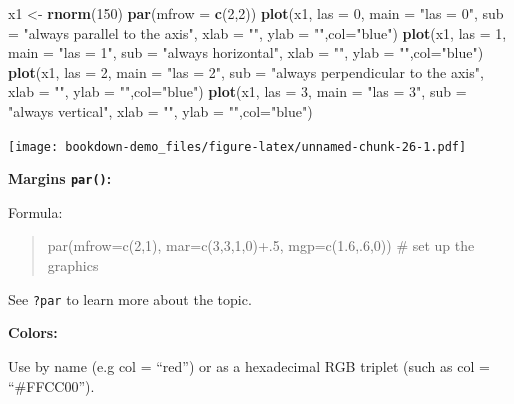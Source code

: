 \documentclass[]{book}
\newenvironment{Shaded}{\begin{snugshade}}{\end{snugshade}}
\newcommand{\KeywordTok}[1]{\textcolor[rgb]{0.13,0.29,0.53}{\textbf{#1}}}
\newcommand{\DataTypeTok}[1]{\textcolor[rgb]{0.13,0.29,0.53}{#1}}
\newcommand{\DecValTok}[1]{\textcolor[rgb]{0.00,0.00,0.81}{#1}}
\newcommand{\StringTok}[1]{\textcolor[rgb]{0.31,0.60,0.02}{#1}}
\newcommand{\NormalTok}[1]{#1}
\begin{document}
\begin{Shaded}
\begin{Highlighting}[]
\NormalTok{x1 <-}\StringTok{ }\KeywordTok{rnorm}\NormalTok{(}\DecValTok{150}\NormalTok{)}
\KeywordTok{par}\NormalTok{(}\DataTypeTok{mfrow =} \KeywordTok{c}\NormalTok{(}\DecValTok{2}\NormalTok{,}\DecValTok{2}\NormalTok{))}
\KeywordTok{plot}\NormalTok{(x1, }\DataTypeTok{las =} \DecValTok{0}\NormalTok{, }\DataTypeTok{main =} \StringTok{"las = 0"}\NormalTok{, }\DataTypeTok{sub =} \StringTok{"always parallel to the axis"}\NormalTok{, }\DataTypeTok{xlab =} \StringTok{""}\NormalTok{, }\DataTypeTok{ylab =} \StringTok{""}\NormalTok{,}\DataTypeTok{col=}\StringTok{"blue"}\NormalTok{)}
\KeywordTok{plot}\NormalTok{(x1, }\DataTypeTok{las =} \DecValTok{1}\NormalTok{, }\DataTypeTok{main =} \StringTok{"las = 1"}\NormalTok{, }\DataTypeTok{sub =} \StringTok{"always horizontal"}\NormalTok{, }\DataTypeTok{xlab =} \StringTok{""}\NormalTok{, }\DataTypeTok{ylab =} \StringTok{""}\NormalTok{,}\DataTypeTok{col=}\StringTok{"blue"}\NormalTok{) }
\KeywordTok{plot}\NormalTok{(x1, }\DataTypeTok{las =} \DecValTok{2}\NormalTok{, }\DataTypeTok{main =} \StringTok{"las = 2"}\NormalTok{, }\DataTypeTok{sub =} \StringTok{"always perpendicular to the axis"}\NormalTok{, }\DataTypeTok{xlab =} \StringTok{""}\NormalTok{, }\DataTypeTok{ylab =} \StringTok{""}\NormalTok{,}\DataTypeTok{col=}\StringTok{"blue"}\NormalTok{)}
\KeywordTok{plot}\NormalTok{(x1, }\DataTypeTok{las =} \DecValTok{3}\NormalTok{, }\DataTypeTok{main =} \StringTok{"las = 3"}\NormalTok{, }\DataTypeTok{sub =} \StringTok{"always vertical"}\NormalTok{, }\DataTypeTok{xlab =} \StringTok{""}\NormalTok{, }\DataTypeTok{ylab =} \StringTok{""}\NormalTok{,}\DataTypeTok{col=}\StringTok{"blue"}\NormalTok{)}
\end{Highlighting}
\end{Shaded}

\texttt{[image: bookdown-demo\_files/figure-latex/unnamed-chunk-26-1.pdf]}

\textbf{Margins \texttt{par()}: }

Formula:

\begin{quote}
par(mfrow=c(2,1), mar=c(3,3,1,0)+.5, mgp=c(1.6,.6,0)) \# set up the
graphics
\end{quote}

See \texttt{?par} to learn more about the topic.

\textbf{Colors: }

Use by name (e.g col = ``red'') or as a hexadecimal RGB triplet (such as
col = ``\#FFCC00'').
\end{document}
